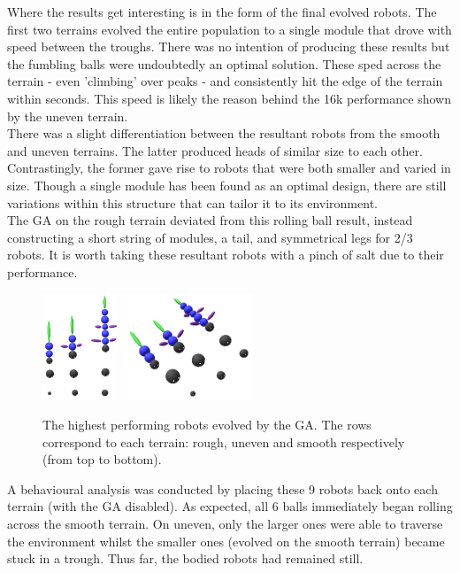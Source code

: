 \documentclass{article}
\begin{document}
Where the results get interesting is in the form of the final evolved robots. The first two terrains evolved the entire population to a single module that drove with speed between the troughs. There was no intention of producing these results but the fumbling balls were undoubtedly an optimal solution. These sped across the terrain - even 'climbing' over peaks - and consistently hit the edge of the terrain within seconds. This speed is likely the reason behind the 16k performance shown by the uneven terrain. \\
There was a slight differentiation between the resultant robots from the smooth and uneven terrains. The latter produced heads of similar size to each other. Contrastingly, the former gave rise to robots that were both smaller and varied in size. Though a single module has been found as an optimal design, there are still variations within this structure that can tailor it to its environment. \\
The GA on the rough terrain deviated from this rolling ball result, instead constructing a short string of modules, a tail, and symmetrical legs for 2/3 robots. It is worth taking these resultant robots with a pinch of salt due to their performance.\\

\begin{figure}[H]
\centering
\centerline{
\includegraphics[width=0.2\textwidth]{best-above}
\includegraphics[width=0.35\textwidth]{best-side}
}
\caption{The highest performing robots evolved by the GA. The rows correspond to each terrain: rough, uneven and smooth respectively (from top to bottom).}
\end{figure}

\newpage
A behavioural analysis was conducted by placing these 9 robots back onto each terrain (with the GA disabled). As expected, all 6 balls immediately began rolling across the smooth terrain. On uneven, only the larger ones were able to traverse the environment whilst the smaller ones (evolved on the smooth terrain) became stuck in a trough. Thus far, the bodied robots had remained still. 
\end{document}
